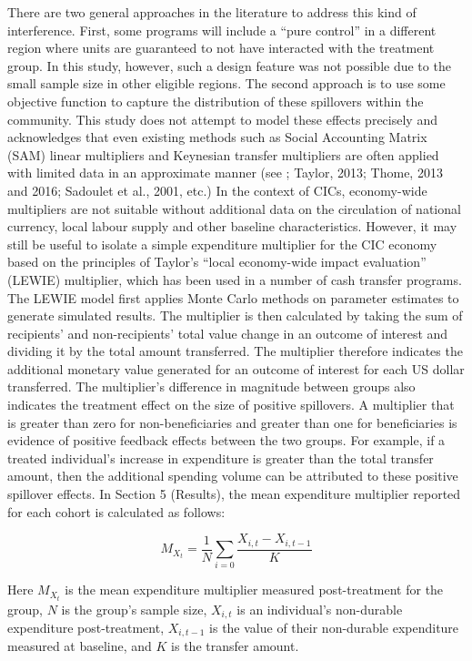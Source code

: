 \documentclass[12pt]{article}
\begin{document}
There are two general approaches in the literature to address this kind of interference. First, some programs will include a “pure control” in a different region where units are guaranteed to not have interacted with the treatment group. In this study, however, such a design feature was not possible due to the small sample size in other eligible regions. The second approach is to use some objective function to capture the distribution of these spillovers within the community. This study does not attempt to model these effects precisely and acknowledges that even existing methods such as Social Accounting Matrix (SAM) linear multipliers and Keynesian transfer multipliers are often applied with limited data in an approximate manner (see \cite{egger2019general}; Taylor, 2013; Thome, 2013 and 2016; Sadoulet et al., 2001, etc.) In the context of CICs, economy-wide multipliers are not suitable without additional data on the circulation of national currency, local labour supply and other baseline characteristics. However, it may still be useful to isolate a simple expenditure multiplier for the CIC economy based on the principles of Taylor’s “local economy-wide impact evaluation” (LEWIE) multiplier, which has been used in a number of cash transfer programs. The LEWIE model first applies Monte Carlo methods on parameter estimates to generate simulated results. The multiplier is then calculated by taking the sum of recipients’ and non-recipients’ total value change in an outcome of interest and dividing it by the total amount transferred. The multiplier therefore indicates the additional monetary value generated for an outcome of interest for each US dollar transferred. The multiplier’s difference in magnitude between groups also indicates the treatment effect on the size of positive spillovers. A multiplier that is greater than zero for non-beneficiaries and greater than one for beneficiaries is evidence of positive feedback effects between the two groups. For example, if a treated individual’s increase in expenditure is greater than the total transfer amount, then the additional spending volume can be attributed to these positive spillover effects. In Section 5 (Results), the mean expenditure multiplier reported for each cohort is calculated as follows:

\begin{equation}
    M_{X_{t}}=\frac{1}{N} \sum_{i=0} \frac{X_{i, t}-X_{i, t-1}}{K}
    \label{eq:eq1}
\end{equation}

Here $M_{X_{t}}$ is the mean expenditure multiplier measured post-treatment for the group, $N$ is the group's sample size, $X_{i, t}$ is an individual's non-durable expenditure post-treatment, $X_{i, t-1}$ is the value of their non-durable expenditure measured at baseline, and $K$ is the transfer amount.
\end{document}
